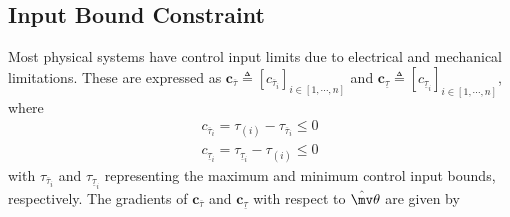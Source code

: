 \documentclass[lettersize,journal]{IEEEtran}
\newcommand*{\wth}{\mv\theta}
\begin{document}
\subsection{Input Bound Constraint}

Most physical systems have control input limits due to electrical and mechanical limitations. These are expressed as $\mathbf{c}_{\overline \tau}\triangleq [c_{\overline \tau_i}]_{i\in[1,\cdots,n]}$ and $\mathbf{c}_{\underline\tau}\triangleq [c_{\underline\tau_i}]_{i\in[1,\cdots,n]}$, where
\begin{equation}
    \begin{aligned}
        c_{\overline \tau_i}=\tau_{(i)} - {\tau_{\overline \tau_i}} \le 0
        \\
        c_{\underline\tau_i}={\tau_{\underline\tau_i}}-\tau_{(i)} \le 0
    \end{aligned}
    \label{eq. cstr input saturation}
\end{equation}
with $\tau_{\overline \tau_i}$ and $\tau_{\underline\tau_i}$ representing the maximum and minimum control input bounds, respectively.
The gradients of $\mathbf{c}_{\overline \tau}$ and $\mathbf{c}_{\underline\tau}$ with respect to $\hat\wth$ are given by
\end{document}
